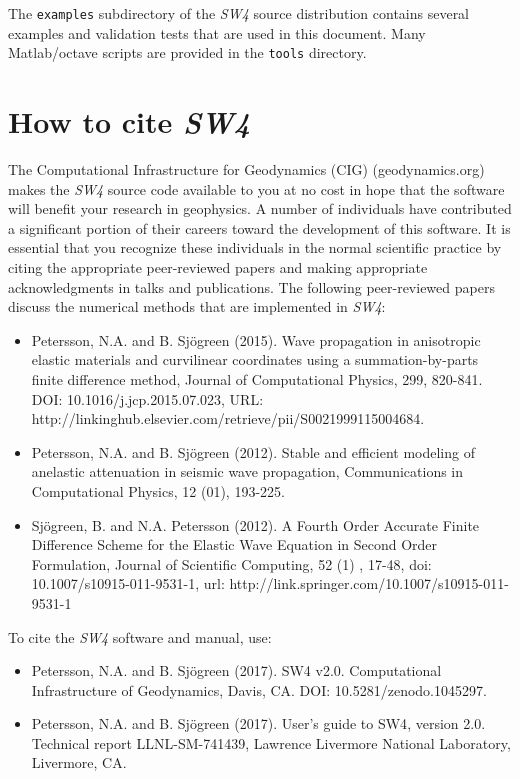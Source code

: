\documentclass[11pt]{report}
\begin{document}
The {\tt examples} subdirectory of the \emph{SW4} source distribution contains several examples and
validation tests that are used in this document. Many Matlab/octave scripts are provided in the
{\tt tools} directory.

\section{How to cite \emph{SW4}}

The Computational Infrastructure for Geodynamics (CIG) (geodynamics.org) makes the \emph{SW4}
source code available to you at no cost in hope that the software will benefit your
research in geophysics. A number of individuals have contributed a significant portion of their
careers toward the development of this software. It is essential that you recognize these
individuals in the normal scientific practice by citing the appropriate peer-reviewed papers and
making appropriate acknowledgments in talks and publications. The following peer-reviewed papers
discuss the numerical methods that are implemented in \emph{SW4}:
\begin{itemize}
%
  \item Petersson, N.A. and B. Sj\"ogreen (2015). Wave propagation in anisotropic elastic materials
    and curvilinear coordinates using a summation-by-parts finite difference method, Journal of
    Computational Physics, 299, 820-841. DOI: 10.1016/j.jcp.2015.07.023, URL:
    http://linkinghub.elsevier.com/retrieve/pii/S0021999115004684.
%
  \item Petersson, N.A. and B. Sj\"ogreen (2012). Stable and efficient modeling of anelastic
    attenuation in seismic wave propagation, Communications in Computational Physics, 12 (01),
    193-225.
%
  \item Sj\"ogreen, B. and N.A. Petersson (2012). A Fourth Order Accurate Finite Difference Scheme
    for the Elastic Wave Equation in Second Order Formulation, Journal of Scientific Computing, 52
    (1) , 17-48, doi: 10.1007/s10915-011-9531-1, url:
    http://link.springer.com/10.1007/s10915-011-9531-1
\end{itemize}
To cite the \emph{SW4} software and manual, use:
\begin{itemize}
%
\item Petersson, N.A. and B. Sj\"ogreen (2017). SW4 v2.0. Computational Infrastructure of
Geodynamics, Davis, CA. DOI: 10.5281/zenodo.1045297.
%
\item Petersson, N.A. and B. Sj\"ogreen (2017). User's guide to {SW4}, version 2.0. Technical report
  LLNL-SM-741439, Lawrence Livermore National Laboratory, Livermore, CA.
%
\end{itemize}
\end{document}
